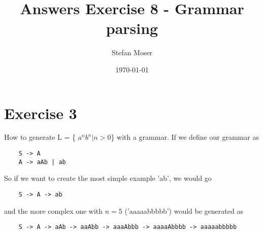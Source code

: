 \documentclass[11pt]{article}
\title{\textbf{Answers Exercise 8 - Grammar parsing}}
\author{Stefan Moser}
\date{\today}
\begin{document}
\maketitle

\section*{Exercise 3}
How to generate L = \{ $a^n b^n | n > 0 $\} with a grammar. If we define our grammar as
\begin{verbatim}
	S -> A
	A -> aAb | ab
\end{verbatim}
So if we want to create the most simple example 'ab', we would go
\begin{verbatim}
	S -> A -> ab
\end{verbatim}
and the more complex one with $n=5$ ('aaaaabbbbb') would be generated as
\begin{verbatim}
	S -> A -> aAb -> aaAbb -> aaaAbbb -> aaaaAbbbb -> aaaaabbbbb
\end{verbatim}
\end{document}

